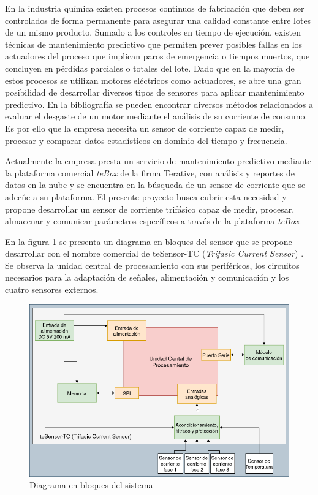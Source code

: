 \documentclass[11pt]{charter}
\begin{document}
En la industria química existen procesos continuos de fabricación que deben ser controlados de forma permanente para asegurar una calidad constante entre lotes de un mismo producto. Sumado a los controles en tiempo de ejecución, existen técnicas de mantenimiento predictivo que permiten prever posibles fallas en los actuadores del proceso que implican paros de emergencia o tiempos muertos, que concluyen en pérdidas parciales o totales del lote.
Dado que en la mayoría de estos procesos se utilizan motores eléctricos como actuadores, se abre una gran posibilidad de desarrollar diversos tipos de sensores para aplicar mantenimiento predictivo. En la bibliografía se pueden encontrar diversos métodos relacionados a evaluar el desgaste de un motor mediante el análisis de su corriente de consumo. Es por ello que la empresa \empclientename necesita un sensor de corriente capaz de medir, procesar y comparar datos estadísticos en dominio del tiempo y frecuencia.

Actualmente la empresa presta un servicio de mantenimiento predictivo mediante la plataforma comercial \textit{teBox} de la firma Terative, con análisis y reportes de datos en la nube y se encuentra en la búsqueda de un sensor de corriente que se adecúe a su plataforma. El presente proyecto busca cubrir esta necesidad y propone desarrollar un sensor de corriente trifásico capaz de medir, procesar, almacenar y comunicar parámetros específicos a través de la plataforma \textit{teBox}.

En la figura \ref{fig:diagBloques} se presenta un diagrama en bloques del sensor que se propone desarrollar con el nombre comercial de teSensor-TC (\textit{Trifasic Current Sensor}) . Se observa la unidad central de procesamiento con sus periféricos, los circuitos necesarios para la adaptación de señales, alimentación y comunicación y los cuatro sensores externos.

\vspace{25px}

\begin{figure}[htpb]
\centering 
\includegraphics[width=.9\textwidth]{./Figuras/diagBloque.png}
\caption{Diagrama en bloques del sistema}
\label{fig:diagBloques}
\end{figure}
\end{document}
